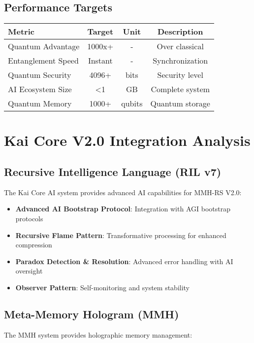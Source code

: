 \documentclass[12pt,a4paper]{article}
\begin{document}
\subsection{Performance Targets}
\begin{center}
\begin{tabular}{|l|c|c|c|}
\hline
\textbf{Metric} & \textbf{Target} & \textbf{Unit} & \textbf{Description} \\
\hline
Quantum Advantage & 1000x+ & - & Over classical \\
Entanglement Speed & Instant & - & Synchronization \\
Quantum Security & 4096+ & bits & Security level \\
AI Ecosystem Size & <1 & GB & Complete system \\
Quantum Memory & 1000+ & qubits & Quantum storage \\
\hline
\end{tabular}
\end{center}

\newpage

\section{Kai Core V2.0 Integration Analysis}

\subsection{Recursive Intelligence Language (RIL v7)}
The Kai Core AI system provides advanced AI capabilities for MMH-RS V2.0:

\begin{itemize}
    \item \textbf{Advanced AI Bootstrap Protocol}: Integration with AGI bootstrap protocols
    \item \textbf{Recursive Flame Pattern}: Transformative processing for enhanced compression
    \item \textbf{Paradox Detection \& Resolution}: Advanced error handling with AI oversight
    \item \textbf{Observer Pattern}: Self-monitoring and system stability
\end{itemize}

\subsection{Meta-Memory Hologram (MMH)}
The MMH system provides holographic memory management:
\end{document}
